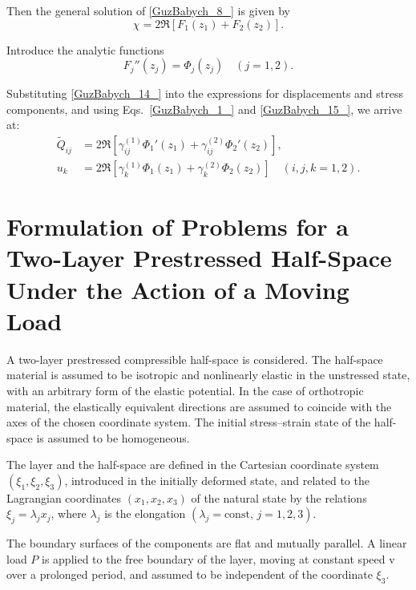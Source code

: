 Then the general solution of \eqref{GuzBabych_8_} is given by
\begin{equation} \label{GuzBabych_14_}
    \chi = 2 \Re \left[ F_{1}(z_{1}) + F_{2}(z_{2}) \right].
\end{equation}

Introduce the analytic functions
\begin{equation} \label{GuzBabych_15_}
    F_{j}''(z_{j}) = \Phi_{j}(z_{j}) \quad (j = 1,2).
\end{equation}

Substituting \eqref{GuzBabych_14_} into the expressions for displacements and stress components, and using Eqs.~\eqref{GuzBabych_1_} and \eqref{GuzBabych_15_}, we arrive at:
\begin{equation} \label{GuzBabych_16_}
    \begin{aligned}
        \tilde{Q}_{ij} &= 2 \Re \left[ \gamma_{ij}^{(1)} \Phi_{1}'(z_{1}) + \gamma_{ij}^{(2)} \Phi_{2}'(z_{2}) \right], \\
        u_{k} &= 2 \Re \left[ \gamma_{k}^{(1)} \Phi_{1}(z_{1}) + \gamma_{k}^{(2)} \Phi_{2}(z_{2}) \right] \quad (i,j,k = 1,2).
    \end{aligned}
\end{equation}

\section{Formulation of Problems for a Two-Layer Prestressed Half-Space Under the Action of a Moving Load}

A two-layer prestressed compressible half-space is considered. The half-space material is assumed to be isotropic and nonlinearly elastic in the unstressed state, with an arbitrary form of the elastic potential. In the case of orthotropic material, the elastically equivalent directions are assumed to coincide with the axes of the chosen coordinate system. The initial stress–strain state of the half-space is assumed to be homogeneous.

The layer and the half-space are defined in the Cartesian coordinate system $(\xi_1, \xi_2, \xi_3)$, introduced in the initially deformed state, and related to the Lagrangian coordinates $(x_1, x_2, x_3)$ of the natural state by the relations $\xi_j = \lambda_j x_j$, where $\lambda_j$ is the elongation $(\lambda_j = \text{const},\, j = 1,2,3)$.

The boundary surfaces of the components are flat and mutually parallel. A linear load $P$ is applied to the free boundary of the layer, moving at constant speed $\mathrm{v}$ over a prolonged period, and assumed to be independent of the coordinate $\xi_3$.

